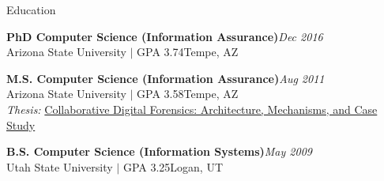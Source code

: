 \documentclass{resume} %
\begin{document}

\begin{rSection}{Education}

\textbf{PhD Computer Science (Information Assurance)}\hfill \emph{Dec 2016}\\
Arizona State University $\mid$ GPA 3.74\hfill {Tempe, AZ}

\textbf{M.S. Computer Science (Information Assurance)}\hfill \emph{Aug 2011}\\
Arizona State University $\mid$ GPA 3.58\hfill {Tempe, AZ}\\
\textit{Thesis:} \href{http://repository.asu.edu/attachments/56996/content/Mabey_asu_0010N_10959.pdf}{Collaborative Digital Forensics: Architecture, Mechanisms, and Case Study}

\textbf{B.S. Computer Science (Information Systems)}\hfill \emph{May 2009}\\
Utah State University $\mid$ GPA 3.25\hfill {Logan, UT}

\end{rSection}


\end{document}
